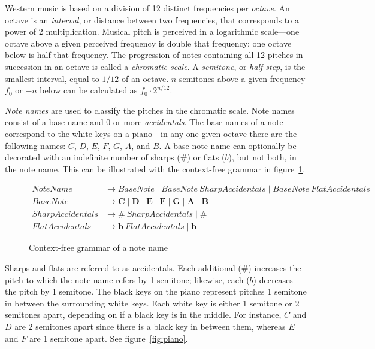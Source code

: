 Western music is based on a division of 12 distinct frequencies per \textit{octave}. An octave is an \textit{interval}, or distance between two frequencies, that corresponds to a power of 2 multiplication. Musical pitch is perceived in a logarithmic scale---one octave above a given perceived frequency is double that frequency; one octave below is half that frequency. The progression of notes containing all 12 pitches in succession in an octave is called a \textit{chromatic scale}. A \textit{semitone}, or \textit{half-step}, is the smallest interval, equal to $1/12$ of an octave. $n$ semitones above a given frequency $f_0$ or $-n$ below can be calculated as $f_0 \cdot 2^{n/12}$.

\textit{Note names} are used to classify the pitches in the chromatic scale. Note names consist of a base name and 0 or more \textit{accidentals}. The base names of a note correspond to the white keys on a piano---in any one given octave there are the following names: $C$, $D$, $E$, $F$, $G$, $A$, and $B$. A base note name can optionally be decorated with an indefinite number of sharps ($\#$) or flats ($b$), but not both, in the note name. This can be illustrated with the context-free grammar in figure~\ref{fig:cfgnote}.

\begin{figure}[h!]
\begin{center}
\begin{align*}
NoteName &\to BaseNote \mid BaseNote\ SharpAccidentals \mid BaseNote\ FlatAccidentals \\
BaseNote &\to \mathbf{C} \mid \mathbf{D} \mid \mathbf{E} \mid \mathbf{F} \mid \mathbf{G} \mid \mathbf{A} \mid \mathbf{B} \\
SharpAccidentals &\to \bm{\textit{\#}}\ SharpAccidentals \mid \bm{\textit{\#}} \\
FlatAccidentals &\to \bm{b}\ FlatAccidentals \mid \bm{b}
\end{align*}
\caption{Context-free grammar of a note name}
\label{fig:cfgnote}
\end{center}
\end{figure}

Sharps and flats are referred to as accidentals. Each additional ($\#$) increases the pitch to which the note name refers by 1 semitone; likewise, each ($b$) decreases the pitch by 1 semitone.  The black keys on the piano represent pitches 1 semitone in between the surrounding white keys. Each white key is either 1 semitone or 2 semitones apart, depending on if a black key is in the middle. For instance, $C$ and $D$ are 2 semitones apart since there is a black key in between them, whereas $E$ and $F$ are 1 semitone apart. See figure~\ref{fig:piano}.
